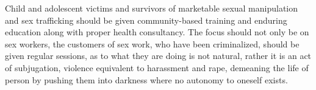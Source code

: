 \begin{multicols}{2}
\noi
Child and adolescent victims and survivors of marketable sexual manipulation and sex
trafficking should be given community-based training and enduring education along with
proper health consultancy. The focus should not only be on sex workers, the customers of sex
work, who have been criminalized, should be given regular sessions, as to what they are doing
is not natural, rather it is an act of subjugation, violence equivalent to harassment and rape,
demeaning the life of person by pushing them into darkness where no autonomy to oneself
exists.
\end{multicols}
	
\label{end2017-art3}
